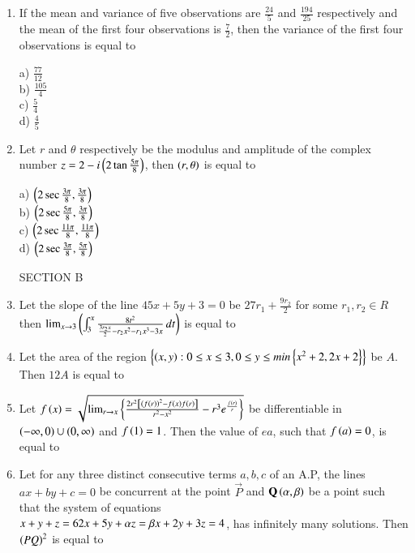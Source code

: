 \documentclass[journal]{IEEEtran}
\begin{document}
\begin{enumerate}
\item   If the mean and variance of five observations are $\frac{24}{5}$ and $\frac{194}{25}$ respectively and the mean of the first four observations is $\frac{7}{2}$, then the variance of the first four observations is equal to
\begin{multicols}{4}
    a) $\frac{77}{12}$\\
    b) $\frac{105}{4}$\\
    c) $\frac{5}{4}$\\
    d) $\frac{4}{5}$
\end{multicols}

\item Let $r$ and $\theta$ respectively be the modulus and amplitude of the complex number $z=2-i\left(2\tan \frac{5\pi}{8}\right)$, then $\left(r,\theta\right)$ is equal to
\begin{multicols}{4}
    a) $\left(2\sec \frac{3\pi}{8}, \frac{3\pi}{8}\right)$\\
    b) $\left(2\sec \frac{5\pi}{8}, \frac{3\pi}{8}\right)$\\
    c) $\left(2\sec \frac{11\pi}{8}, \frac{11\pi}{8}\right)$\\
    d) $\left(2\sec \frac{3\pi}{8}, \frac{5\pi}{8}\right)$
\end{multicols}
SECTION B
\item Let the slope of the line $45x+5y+3=0$ be $27r_1+\frac{9r_2}{2}$ for some $r_1,r_2\in R$ then $\lim_{x \to 3}\left( \int_{3}^{x} \frac{8t^2}{\frac{3r_2x}{2}-r_2x^2-r_1x^3-3x} \, dt\right)$ is equal to

\item Let the area of the region $\left\{\left(x,y\right):0\leq x \leq 3, 0\leq y\leq min\left\{x^2+2,2x+2\right\}\right\}$ be $A$. Then $12A$ is equal to

\item Let $f\left(x\right)=\sqrt{\lim_{r \to x}\left\{\frac{2r^2{}\left[\left(f\left(r\right)\right)^2-f\left(x\right)f\left(r\right)\right]}{r^2-x^2}-r^3e^{\frac{f\left(r\right)}{r}}\right\}}$ be differentiable in $\left(-\infty,0\right)\cup\left(0,\infty\right)$ and $f\left(1\right)=1$. Then the value of $ea$, such that $f\left(a\right)=0$, is equal to

\item Let for any three distinct consecutive terms $a,b,c$ of an A.P, the lines $ax+by+c=0$ be concurrent at the point $\vec{P}$ and $\mathbf{Q}\left(\alpha,\beta\right)$ be a point such that the system of equations \\
$x+y+z=6\\
2x+5y+\alpha z=\beta\\
x+2y+3z=4$, has infinitely many solutions. Then $\left(PQ\right)^2$ is equal to


\end{enumerate}
\end{document}
